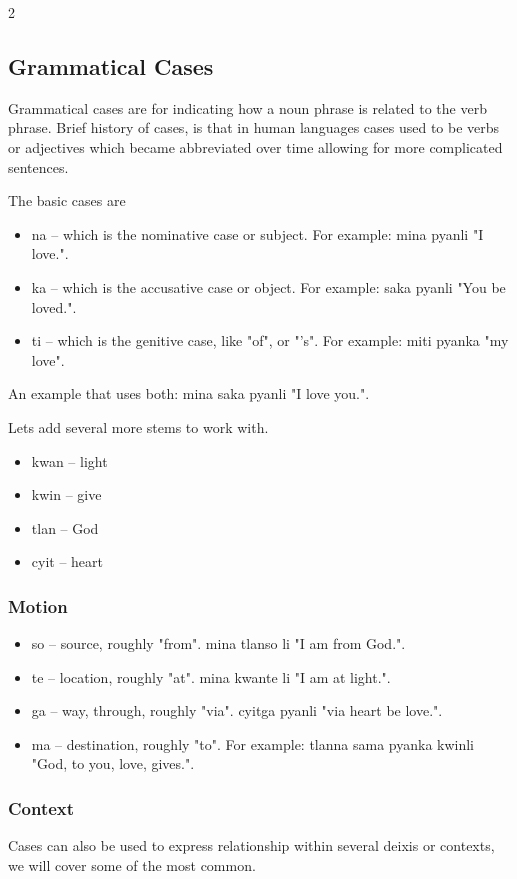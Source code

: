 \documentclass[10pt,pagesize]{article}
\providecommand{\tightlist}{%
  \setlength{\itemsep}{0pt}\setlength{\parskip}{0pt}}
\begin{document}
\begin{multicols}{2}
  \subsection{Grammatical Cases}
Grammatical cases are for indicating how a noun phrase is related to the verb phrase. Brief history of cases, is that in human languages cases used to be verbs or adjectives which became abbreviated over time allowing for more complicated sentences.

The basic cases are 

  \begin{itemize}\tightlist
    \item na -- which is the nominative case or subject. For example: mina pyanli "I love.".
    \item ka -- which is the accusative case or object. For example: saka pyanli "You be loved.".
    \item ti -- which is the genitive case, like "of", or "'s". For example: miti pyanka "my love".
  \end{itemize}

An example that uses both: mina saka pyanli "I love you.".

Lets add several more stems to work with. 

\begin{itemize}\tightlist
  \item kwan -- light
  \item kwin -- give
  \item tlan -- God
  \item cyit -- heart
\end{itemize}

\subsubsection{Motion}


\begin{itemize}\tightlist
  \item so -- source, roughly "from". mina tlanso li "I am from God.".
  \item te -- location, roughly "at". mina kwante li "I am at light.".
  \item ga -- way, through, roughly "via". cyitga pyanli "via heart be love.".
  \item ma -- destination, roughly "to". For example: tlanna sama pyanka kwinli "God, to you, love, gives.".
\end{itemize}

\subsubsection{Context}
Cases can also be used to express relationship within several deixis or contexts, we will cover some of the most common.


\end{multicols}
\end{document}

